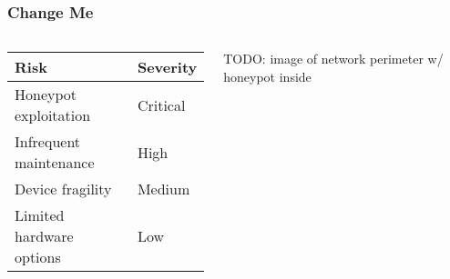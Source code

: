 \begin{frame}
\frametitle{Change Me}

\begin{columns}[c]

\begin{table}
\begin{center}
\begin{tabular}{l l}
\textbf{Risk} & \textbf{Severity} \\
\midrule
Honeypot exploitation & Critical \\
Infrequent maintenance & High \\
Device fragility & Medium \\
Limited hardware options & Low \\
\bottomrule
\end{tabular}
\end{center}
\end{table}


TODO: image of network perimeter w/ honeypot inside

\end{columns}

\end{frame}
